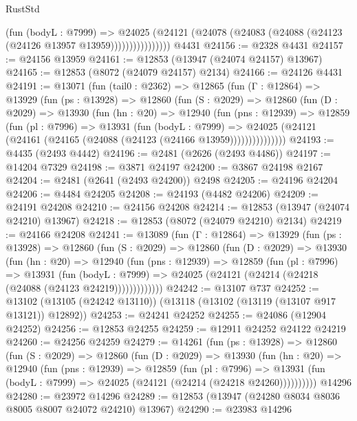 \begin{lexlean}{RustStd}
\begin{coremodule}
                      (fun (bodyL : @7999) =>
                      @24025
                        (@24121
                          (@24078 (@24083 (@24088 (@24123 (@24126 @13957 @13959))))))))))))))))
    @4431
@24156 := @2328 @4431
@24157 := @24156 @13959
@24161 := @12853 (@13947 (@24074 @24157) @13967)
@24165 := @12853 (@8072 (@24079 @24157) @2134)
@24166 := @24126 @4431
@24191 := @13071
    (fun (tail0 : @2362) =>
    @12865
      (fun (Γ : @12864) =>
      @13929
        (fun (ps : @13928) =>
        @12860
          (fun (S : @2029) =>
          @12860
            (fun (D : @2029) =>
            @13930
              (fun (hn : @20) =>
              @12940
                (fun (pns : @12939) =>
                @12859
                  (fun (pl : @7996) =>
                  @13931
                    (fun (bodyL : @7999) =>
                    @24025 (@24121 (@24161 (@24165 (@24088 (@24123 (@24166 @13959)))))))))))))))
@24193 := @4435 (@2493 @4442)
@24196 := @2481 (@2626 (@2493 @4486))
@24197 := @14204 @7329
@24198 := @3871 @24197
@24200 := @3867 @24198 @2167
@24204 := @2481 (@2641 (@2493 @24200)) @2498
@24205 := @24196 @24204
@24206 := @4484 @24205
@24208 := @24193 (@4482 @24206)
@24209 := @24191 @24208
@24210 := @24156 @24208
@24214 := @12853 (@13947 (@24074 @24210) @13967)
@24218 := @12853 (@8072 (@24079 @24210) @2134)
@24219 := @24166 @24208
@24241 := @13089
    (fun (Γ : @12864) =>
    @13929
      (fun (ps : @13928) =>
      @12860
        (fun (S : @2029) =>
        @12860
          (fun (D : @2029) =>
          @13930
            (fun (hn : @20) =>
            @12940
              (fun (pns : @12939) =>
              @12859
                (fun (pl : @7996) =>
                @13931
                  (fun (bodyL : @7999) =>
                  @24025 (@24121 (@24214 (@24218 (@24088 (@24123 @24219)))))))))))))
@24242 := @13107 @737
@24252 := @13102 (@13105 (@24242 @13110)) (@13118 (@13102 (@13119 (@13107 @917 @13121)) @12892))
@24253 := @24241 @24252
@24255 := @24086 (@12904 @24252)
@24256 := @12853 @24255
@24259 := @12911 @24252 @24122 @24219
@24260 := @24256 @24259
@24279 := @14261
    (fun (ps : @13928) =>
    @12860
      (fun (S : @2029) =>
      @12860
        (fun (D : @2029) =>
        @13930
          (fun (hn : @20) =>
          @12940
            (fun (pns : @12939) =>
            @12859
              (fun (pl : @7996) =>
              @13931 (fun (bodyL : @7999) => @24025 (@24121 (@24214 (@24218 @24260))))))))))
    @14296
@24280 := @23972 @14296
@24289 := @12853 (@13947 (@24280 @8034 @8036 @8005 @8007 @24072 @24210) @13967)
@24290 := @23983 @14296

\end{coremodule}
\end{lexlean}
